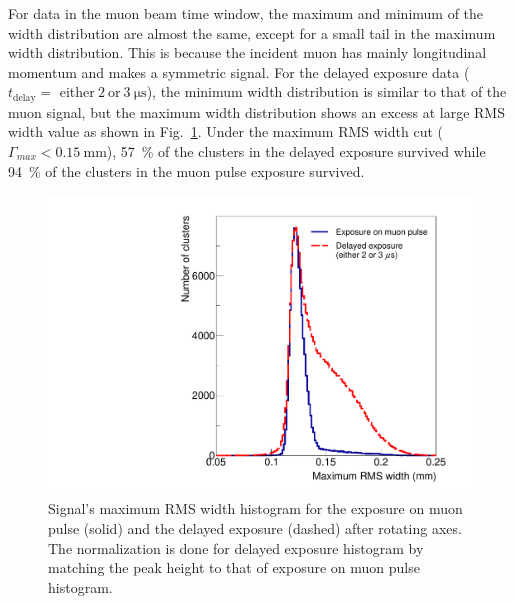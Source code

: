 \documentclass[preprint,3p,twocolumn]{elsarticle}
\begin{document}
For data in the muon beam time window, the maximum and minimum of
the width distribution
are almost the same, except for
a small tail in the maximum width distribution. This is because
the incident muon has mainly longitudinal momentum and makes a
symmetric signal.  
For the delayed exposure data
($t_{\text{delay}} =$ either$~2~$or$~\SI{3}{\micro\s}$),
the minimum width distribution is similar to that of the muon signal,
but the maximum width distribution shows an excess at large RMS width value as shown in Fig.~\ref{fig:positron_width}.
Under the maximum
RMS width cut ($\Gamma_{max} < \SI{0.15}{\mm}$),
\SI{57}{\percent} of the clusters in the delayed exposure
survived while \SI{94}{\percent} of the clusters in the muon
pulse exposure survived.

\begin{figure}[tbp]
	\centering
	\includegraphics[width=\columnwidth]{figure/RMS_legend_v2.pdf}
	\caption{Signal's maximum RMS width histogram for the
          exposure on muon pulse (solid) and the delayed exposure
          (dashed) after rotating axes. The normalization is done for delayed exposure histogram by matching the peak height to that of exposure on muon pulse histogram.}
	\label{fig:positron_width}
\end{figure}
\end{document}
